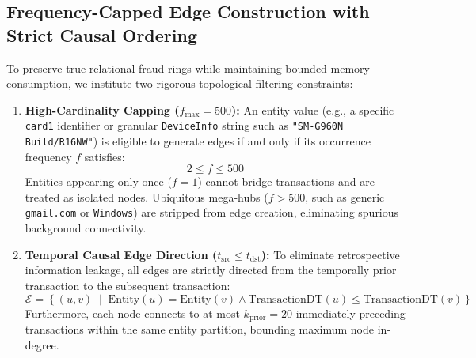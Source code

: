 \documentclass[11pt,a4paper]{article}
\begin{document}
\begin{table}[htbp]
\centering
\small
\caption{Topological Analysis of Candidate Edge Columns on IEEE-CIS}
\label{tab:edge_topology}
\end{table}

\subsection{Frequency-Capped Edge Construction with Strict Causal Ordering}
To preserve true relational fraud rings while maintaining bounded memory consumption, we institute two rigorous topological filtering constraints:
\begin{enumerate}[leftmargin=*]
    \item \textbf{High-Cardinality Capping ($f_{\text{max}} = 500$):} An entity value (e.g., a specific \texttt{card1} identifier or granular \texttt{DeviceInfo} string such as \texttt{"SM-G960N Build/R16NW"}) is eligible to generate edges if and only if its occurrence frequency $f$ satisfies:
    \begin{equation}
    2 \le f \le 500
    \end{equation}
    Entities appearing only once ($f=1$) cannot bridge transactions and are treated as isolated nodes. Ubiquitous mega-hubs ($f > 500$, such as generic \texttt{gmail.com} or \texttt{Windows}) are stripped from edge creation, eliminating spurious background connectivity.
    \item \textbf{Temporal Causal Edge Direction ($t_{\text{src}} \le t_{\text{dst}}$):} To eliminate retrospective information leakage, all edges are strictly directed from the temporally prior transaction to the subsequent transaction:
    \begin{equation}
    \mathcal{E} = \left\{ (u, v) \;\middle|\; \text{Entity}(u) = \text{Entity}(v) \land \text{TransactionDT}(u) \le \text{TransactionDT}(v) \right\}
    \end{equation}
    Furthermore, each node connects to at most $k_{\text{prior}} = 20$ immediately preceding transactions within the same entity partition, bounding maximum node in-degree.
\end{enumerate}
\end{document}
